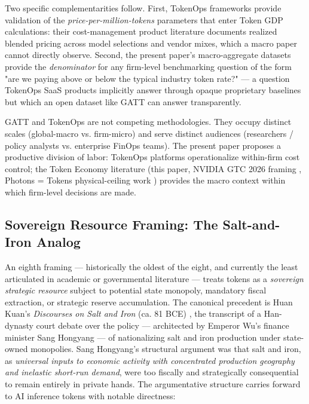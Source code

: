 \documentclass[11pt,a4paper]{article}
\begin{document}
Two specific complementarities follow. First, TokenOps frameworks provide validation of the \emph{price-per-million-tokens} parameters that enter Token GDP calculations: their cost-management product literature documents realized blended pricing across model selections and vendor mixes, which a macro paper cannot directly observe. Second, the present paper's macro-aggregate datasets provide the \emph{denominator} for any firm-level benchmarking question of the form "are we paying above or below the typical industry token rate?" --- a question TokenOps SaaS products implicitly answer through opaque proprietary baselines but which an open dataset like GATT can answer transparently.

GATT and TokenOps are not competing methodologies. They occupy distinct scales (global-macro vs. firm-micro) and serve distinct audiences (researchers / policy analysts vs. enterprise FinOps teams). The present paper proposes a productive division of labor: TokenOps platforms operationalize within-firm cost control; the Token Economy literature (this paper, NVIDIA GTC 2026 framing \cite{huang2026gtc}, Photons = Tokens physical-ceiling work \cite{litowitz2026photons}) provides the macro context within which firm-level decisions are made.

\subsection{Sovereign Resource Framing: The Salt-and-Iron Analog}

An eighth framing --- historically the oldest of the eight, and currently the least articulated in academic or governmental literature --- treats tokens as a \emph{sovereign strategic resource} subject to potential state monopoly, mandatory fiscal extraction, or strategic reserve accumulation. The canonical precedent is Huan Kuan's \emph{Discourses on Salt and Iron} (ca. 81 BCE) \cite{huankuan81bce}, the transcript of a Han-dynasty court debate over the policy --- architected by Emperor Wu's finance minister Sang Hongyang --- of nationalizing salt and iron production under state-owned monopolies. Sang Hongyang's structural argument was that salt and iron, as \emph{universal inputs to economic activity with concentrated production geography and inelastic short-run demand}, were too fiscally and strategically consequential to remain entirely in private hands. The argumentative structure carries forward to AI inference tokens with notable directness:
\end{document}
